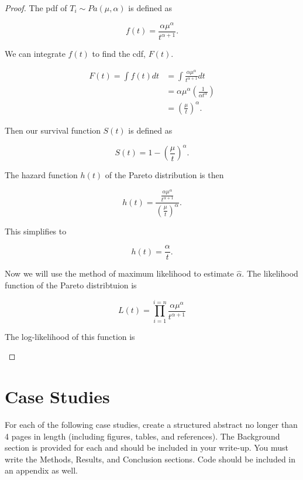 \documentclass{article}
\begin{document}
	\begin{proof}
	The pdf of $T_i \sim Pa(\mu, \alpha)$ is defined as

	\[ f(t) = \frac{\alpha\mu^\alpha}{t^{\alpha + 1}}.\] %

	We can integrate $f(t)$ to find the cdf, $F(t)$.

	\begin{align*}
		F(t) = \int f(t)dt & = \int\frac{\alpha\mu^\alpha}{t^{\alpha + 1}} dt \\
		& = \alpha\mu^\alpha \left( \frac{1}{\alpha t^{\alpha}} \right) \\
		& = \left( \frac{\mu}{t} \right)^\alpha .
	\end{align*} %

	Then our survival function $S(t)$ is defined as

	\[S(t) = 1 - \left( \frac{\mu}{t} \right)^\alpha .\] %

	The hazard function $h(t)$ of the Pareto distribution is then
	
	\[h(t) = \frac{ \frac{\alpha\mu^\alpha}{t^{\alpha + 1}} }{ \left( \frac{\mu}{t}\right) ^\alpha } .\]

	This simplifies to

	\[ h(t) = \frac{\alpha}{t}.\]

	
	Now we will use the method of maximum likelihood to estimate $\hat{\alpha}$. The likelihood function of the Pareto distribtuion is

	\[L(t) = \prod_{i = 1}^{i = n} \frac{\alpha\mu^\alpha}{t^{\alpha + 1}}\]

	The log-likelihood of this function is

	\[ \]


	\end{proof}

	\newpage
	\section*{Case Studies}
	For each of the following case studies, create a structured abstract no longer than 4 pages in length (including figures, tables, and references). The Background section is provided for each and should be included in your write-up. You must write the Methods, Results, and Conclusion sections. Code should be included in an appendix as well.
\end{document}
